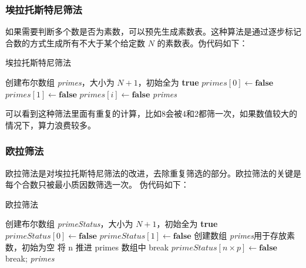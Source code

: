 \subsubsection{埃拉托斯特尼筛法}
如果需要判断多个数是否为素数，可以预先生成素数表。这种算法是通过逐步标记合数的方式生成所有不大于某个给定数 \( N \) 的素数表。伪代码如下：
\begin{algorithm}
	\caption{埃拉托斯特尼筛法}
	\label{algo:SieveOfEratosthenes}
	\begin{algorithmic}[1]
		\State 创建布尔数组 \textit{primes}，大小为 \( N+1 \)，初始全为 \textbf{true}
		\State \( \textit{primes}[0] \gets \textbf{false} \)
		\State \( \textit{primes}[1] \gets \textbf{false} \) 
		\State \( \textit{primes}[i] \gets \textbf{false} \)
		\EndFor
		\EndIf
		\EndFor
		\Return \textit{primes}
		\EndFunction
	\end{algorithmic}
\end{algorithm}

可以看到这种筛法里面有重复的计算，比如8会被4和2都筛一次，如果数值较大的情况下，算力浪费较多。

\subsubsection{欧拉筛法}
欧拉筛法是对埃拉托斯特尼筛法的改进，去除重复筛选的部分。欧拉筛法的关键是每个合数只被最小质因数筛选一次。
伪代码如下：
\begin{algorithm}
	\caption{欧拉筛法}
	\label{algo:SieveOfEuler}
	\begin{algorithmic}[1]
		\State 创建布尔数组 \textit{primeStatus}，大小为 \( N+1 \)，初始全为 \textbf{true}
		\State \( \textit{primeStatus}[0] \gets \textbf{false} \)
		\State \( \textit{primeStatus}[1] \gets \textbf{false} \) 
		\State 创建数组 \textit{primes}用于存放素数，初始为空
		\State 将 n 推进 primes 数组中
		\EndIf
		 \State break 
		\EndIf
		\State \(  {primeStatus[n \times p] \gets \textbf{false}}\)
		 
		\State break;
		\EndIf
		\EndFor
		\EndFor
		\Return \textit{primes}
		\EndFunction
	\end{algorithmic}
\end{algorithm}

